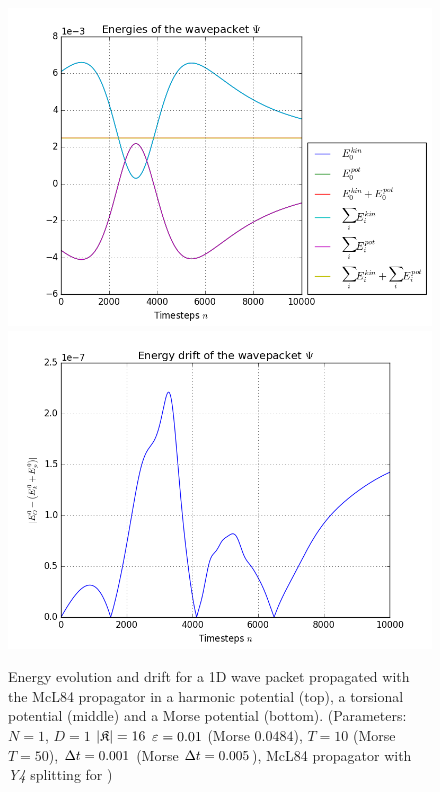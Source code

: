 \begin{figure}[ht]
	\includegraphics[width=.45\textwidth]{figures/morse_1D_McL84_energies.png}
	\includegraphics[width=.45\textwidth]{figures/morse_1D_McL84_drift.png}
	\caption{Energy evolution and drift for a 1D wave packet propagated with the McL84 propagator in a harmonic potential (top), a torsional potential (middle) and a Morse potential (bottom).
	(Parameters: $N=1$, $D=1$ $|\mathfrak{K}|=16$ $\varepsilon=0.01$ (Morse $0.0484$), $T=10$ (Morse $T=50$), $\Delta t=0.001$ (Morse $\Delta t=0.005$), McL84 propagator with \emph{Y4} splitting for )}
	\label{fig:energy_McL84}
\end{figure}
%
